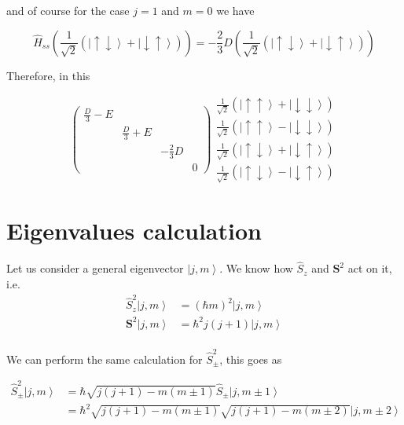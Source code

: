 \documentclass[A4paper, 12pt]{article}
\newcommand{\uu}{\left | \uparrow\uparrow \right \rangle}
\newcommand{\dd}{\left | \downarrow\downarrow \right \rangle}
\newcommand{\du}{\left | \downarrow\uparrow \right \rangle}
\newcommand{\ud}{\left | \uparrow\downarrow \right \rangle}
\newcommand{\mone}{\frac{1}{\sqrt{2}}\left( \ud + \du\right)}
\newcommand{\mmone}{\frac{1}{\sqrt{2}}\left( \ud - \du\right)}
\newcommand{\x}{\frac{1}{\sqrt 2}\left( \uu + \dd\right)}
\newcommand{\y}{\frac{1}{\sqrt 2}\left( \uu - \dd\right)}
\begin{document}
and of course for the case $ j=1 $ and $ m=0 $ we have

\begin{equation}
  \hat{H} _{ss} \left( \mone \right) = -\frac{2}{3}D \left( \mone \right)
\end{equation}

Therefore, in this

\begin{equation}
  \begin{pmatrix}
    \frac{D}{3} - E &                 &               &   \\
                    & \frac{D}{3} + E &               &   \\
                    &                 & -\frac{2}{3}D &   \\
                    &                 &               & 0
  \end{pmatrix}
  \begin{matrix}
    \x     \\
    \y     \\
    \mone  \\
    \mmone
  \end{matrix}
\end{equation}





\appendix
\section{Eigenvalues calculation} %
\label{sec:eigenvalues_calculation}

Let us consider a general eigenvector
$ \left | j,m \right \rangle  $. We know how $ \hat{S}_{z}  $ and $ \mathbf{S}^{2}  $ act on it, i.e.
\begin{align*}
\hat{S}_{z}^{2}  \left | j,m \right \rangle        & =
(\hbar m)^{2} \left | j,m \right \rangle        \\
\mathbf{S}^{2}  \left | j,m \right \rangle         & =
\hbar^{2}  j(j+1)\left | j,m \right \rangle   \\
\end{align*}

We can perform the same calculation for $ \hat{S}_{\pm}^{2}  $, this goes as

\begin{align*}
\hat{S}_{\pm}^{2} \left | j,m \right \rangle &=
  \hbar\sqrt{j(j+1)- m(m\pm 1) } \hat{S}_{\pm} \left | j,m\pm 1 \right \rangle \\
&=
  \hbar^{2}\sqrt{j(j+1)- m(m\pm 1) }\sqrt{j(j+1)- m(m\pm 2) } \left | j,m\pm 2 \right \rangle \\
\end{align*}
\end{document}
